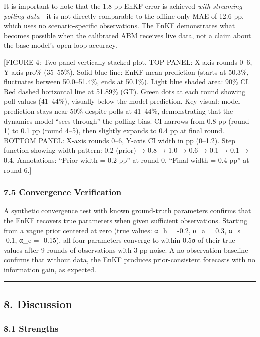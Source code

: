 \documentclass[
]{article}
\begin{document}
It is important to note that the 1.8 pp EnKF error is achieved
\emph{with streaming polling data}---it is not directly comparable to
the offline-only MAE of 12.6 pp, which uses no scenario-specific
observations. The EnKF demonstrates what becomes possible when the
calibrated ABM receives live data, not a claim about the base model's
open-loop accuracy.

{[}FIGURE 4: Two-panel vertically stacked plot. TOP PANEL: X-axis rounds
0--6, Y-axis pro\% (35--55\%). Solid blue line: EnKF mean prediction
(starts at 50.3\%, fluctuates between 50.0--51.4\%, ends at 50.1\%).
Light blue shaded area: 90\% CI. Red dashed horizontal line at 51.89\%
(GT). Green dots at each round showing poll values (41--44\%), visually
below the model prediction. Key visual: model prediction stays near 50\%
despite polls at 41--44\%, demonstrating that the dynamics model ``sees
through'' the polling bias. CI narrows from 0.8 pp (round 1) to 0.1 pp
(round 4--5), then slightly expands to 0.4 pp at final round. BOTTOM
PANEL: X-axis rounds 0--6, Y-axis CI width in pp (0--1.2). Step function
showing width pattern: 0.2 (prior) → 0.8 → 1.0 → 0.6 → 0.1 → 0.1 → 0.4.
Annotations: ``Prior width = 0.2 pp'' at round 0, ``Final width = 0.4
pp'' at round 6.{]}

\subsubsection{7.5 Convergence
Verification}\label{convergence-verification}

A synthetic convergence test with known ground-truth parameters confirms
that the EnKF recovers true parameters when given sufficient
observations. Starting from a vague prior centered at zero (true values:
α\_h = -0.2, α\_a = 0.3, α\_s = -0.1, α\_e = -0.15), all four parameters
converge to within 0.5σ of their true values after 9 rounds of
observations with 3 pp noise. A no-observation baseline confirms that
without data, the EnKF produces prior-consistent forecasts with no
information gain, as expected.

\begin{center}\rule{0.5\linewidth}{0.5pt}\end{center}

\subsection{8. Discussion}\label{discussion}

\subsubsection{8.1 Strengths}\label{strengths}
\end{document}
